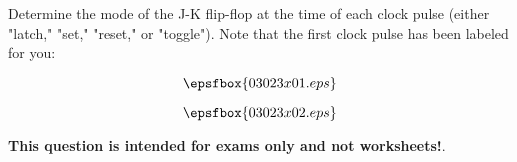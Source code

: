 

Determine the mode of the J-K flip-flop at the time of each clock pulse (either "latch," "set," "reset," or "toggle").  Note that the first clock pulse has been labeled for you:

$$\epsfbox{03023x01.eps}$$







$$\epsfbox{03023x02.eps}$$







{\bf This question is intended for exams only and not worksheets!}.




